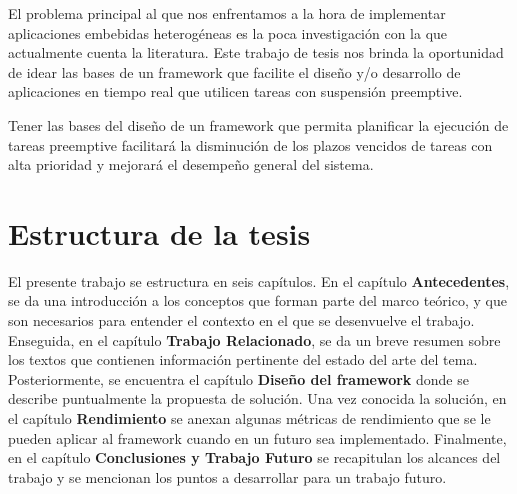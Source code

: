 El problema principal  al que nos enfrentamos a la hora de implementar aplicaciones embebidas heterogéneas es la poca investigación con la que actualmente cuenta la literatura. Este trabajo de tesis nos brinda la oportunidad de idear las bases de un framework que facilite el diseño y/o desarrollo de aplicaciones en tiempo real que utilicen tareas con suspensión preemptive.
\newline

Tener las bases del diseño de un framework que permita planificar la ejecución de tareas preemptive facilitará la disminución de los plazos vencidos de tareas con alta prioridad y mejorará el desempeño general del sistema.

\section {Estructura de la tesis}

El presente trabajo se estructura en seis capítulos.
En el capítulo \textbf{Antecedentes}, se da una introducción a los conceptos que forman parte del marco teórico, y que son necesarios para entender el contexto en el que se desenvuelve el trabajo. Enseguida, en el capítulo \textbf{Trabajo Relacionado}, se da un breve resumen sobre los textos que contienen información pertinente del estado del arte del tema. Posteriormente, se encuentra el capítulo \textbf{Diseño del framework} donde se describe puntualmente la propuesta de solución. Una vez conocida la solución, en el capítulo \textbf{Rendimiento} se anexan algunas métricas de rendimiento que se le pueden aplicar al framework cuando en un futuro sea implementado. Finalmente, en el capítulo \textbf{Conclusiones y Trabajo Futuro} se recapitulan los alcances del trabajo y se mencionan los puntos a desarrollar para un trabajo futuro.

